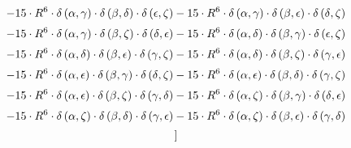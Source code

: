 \begin{subequations}
\begin{gather}
 \\[0.2em] \notag 		 - 15 \cdot R^{6} \cdot \delta{}\left(\alpha{}, \gamma{}\right) \cdot \delta{}\left(\beta{}, \delta{}\right) \cdot \delta{}\left(\epsilon{}, \zeta{}\right)- 15 \cdot R^{6} \cdot \delta{}\left(\alpha{}, \gamma{}\right) \cdot \delta{}\left(\beta{}, \epsilon{}\right) \cdot \delta{}\left(\delta{}, \zeta{}\right) 
 \\[0.2em] \notag 		 - 15 \cdot R^{6} \cdot \delta{}\left(\alpha{}, \gamma{}\right) \cdot \delta{}\left(\beta{}, \zeta{}\right) \cdot \delta{}\left(\delta{}, \epsilon{}\right)- 15 \cdot R^{6} \cdot \delta{}\left(\alpha{}, \delta{}\right) \cdot \delta{}\left(\beta{}, \gamma{}\right) \cdot \delta{}\left(\epsilon{}, \zeta{}\right) 
 \\[0.2em] \notag 		 - 15 \cdot R^{6} \cdot \delta{}\left(\alpha{}, \delta{}\right) \cdot \delta{}\left(\beta{}, \epsilon{}\right) \cdot \delta{}\left(\gamma{}, \zeta{}\right)- 15 \cdot R^{6} \cdot \delta{}\left(\alpha{}, \delta{}\right) \cdot \delta{}\left(\beta{}, \zeta{}\right) \cdot \delta{}\left(\gamma{}, \epsilon{}\right) 
 \\[0.2em] \notag 		 - 15 \cdot R^{6} \cdot \delta{}\left(\alpha{}, \epsilon{}\right) \cdot \delta{}\left(\beta{}, \gamma{}\right) \cdot \delta{}\left(\delta{}, \zeta{}\right)- 15 \cdot R^{6} \cdot \delta{}\left(\alpha{}, \epsilon{}\right) \cdot \delta{}\left(\beta{}, \delta{}\right) \cdot \delta{}\left(\gamma{}, \zeta{}\right) 
 \\[0.2em] \notag 		 - 15 \cdot R^{6} \cdot \delta{}\left(\alpha{}, \epsilon{}\right) \cdot \delta{}\left(\beta{}, \zeta{}\right) \cdot \delta{}\left(\gamma{}, \delta{}\right)- 15 \cdot R^{6} \cdot \delta{}\left(\alpha{}, \zeta{}\right) \cdot \delta{}\left(\beta{}, \gamma{}\right) \cdot \delta{}\left(\delta{}, \epsilon{}\right) 
 \\[0.2em] \notag 		 - 15 \cdot R^{6} \cdot \delta{}\left(\alpha{}, \zeta{}\right) \cdot \delta{}\left(\beta{}, \delta{}\right) \cdot \delta{}\left(\gamma{}, \epsilon{}\right)- 15 \cdot R^{6} \cdot \delta{}\left(\alpha{}, \zeta{}\right) \cdot \delta{}\left(\beta{}, \epsilon{}\right) \cdot \delta{}\left(\gamma{}, \delta{}\right)\\[0.2em] \notag ]
\end{gather}\end{subequations}